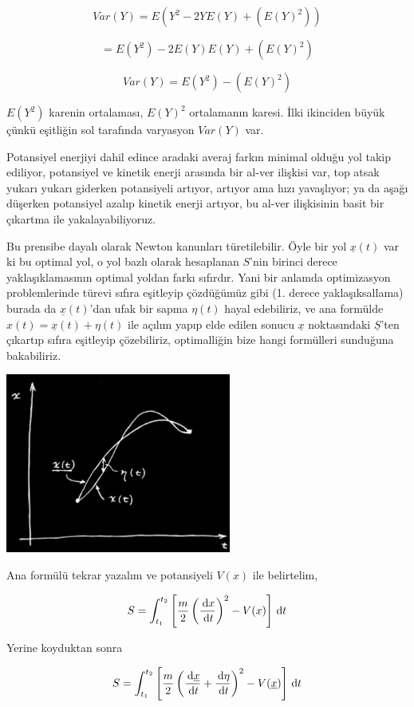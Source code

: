 \documentclass[12pt,fleqn]{article}\usepackage{../../common}
\begin{document}
$$ Var(Y) = E( Y^2  - 2YE(Y) + (E(Y)^2) )$$

$$  = E(Y^2)  - 2E(Y)E(Y) + (E(Y)^2)$$

$$ Var(Y) = E(Y^2) - (E(Y)^2)$$

$E(Y^2)$ karenin ortalaması, $E(Y)^2$ ortalamanın karesi. İlki ikinciden
büyük çünkü eşitliğin sol tarafında varyasyon $Var(Y)$ var. 

Potansiyel enerjiyi dahil edince aradaki averaj farkın minimal olduğu yol
takip ediliyor, potansiyel ve kinetik enerji arasında bir al-ver ilişkisi
var, top atsak yukarı yukarı giderken potansiyeli artıyor, artıyor ama hızı
yavaşlıyor; ya da aşağı düşerken potansiyel azalıp kinetik enerji artıyor,
bu al-ver ilişkisinin basit bir çıkartma ile yakalayabiliyoruz. 

Bu prensibe dayalı olarak Newton kanunları türetilebilir. Öyle bir yol
$\underline{x}(t)$ var ki bu optimal yol, o yol bazlı olarak hesaplanan
$S$'nin birinci derece yaklaşıklamasının optimal yoldan farkı
sıfırdır. Yani bir anlamda optimizasyon problemlerinde türevi sıfıra
eşitleyip çözdüğümüz gibi (1. derece yaklaşıksallama) burada da
$\underline{x}(t)$'dan ufak bir sapma $\eta(t)$ hayal edebiliriz, ve ana
formülde $x(t) = \underline{x}(t) + \eta(t)$ ile açılım yapıp elde edilen
sonucu $\underline{x}$ noktasındaki $\underline{S}$'ten çıkartıp sıfıra
eşitleyip çözebiliriz, optimalliğin bize hangi formülleri sunduğuna
bakabiliriz. 

\includegraphics[width=20em]{phy_lagrange_05.png}

Ana formülü tekrar yazalım ve potansiyeli $V(x)$ ile belirtelim,

$$ 
S = \int_{t_1}^{t_2} 
\left[ 
\frac{m}{2} \left( \frac{\,\mathrm{d} x}{\,\mathrm{d} t} \right)^2 - V(x)
\right] \,\mathrm{d} t
$$

Yerine koyduktan sonra

$$ 
S = \int_{t_1}^{t_2} 
\left[ 
  \frac{m}{2} 
   \left(  \frac{\,\mathrm{d} \underline{x}}{\,\mathrm{d} t} + \frac{\,\mathrm{d} \eta}{\,\mathrm{d} t} \right)^2 - 
   V(\underline{x})
\right] \,\mathrm{d} t
$$
\end{document}
